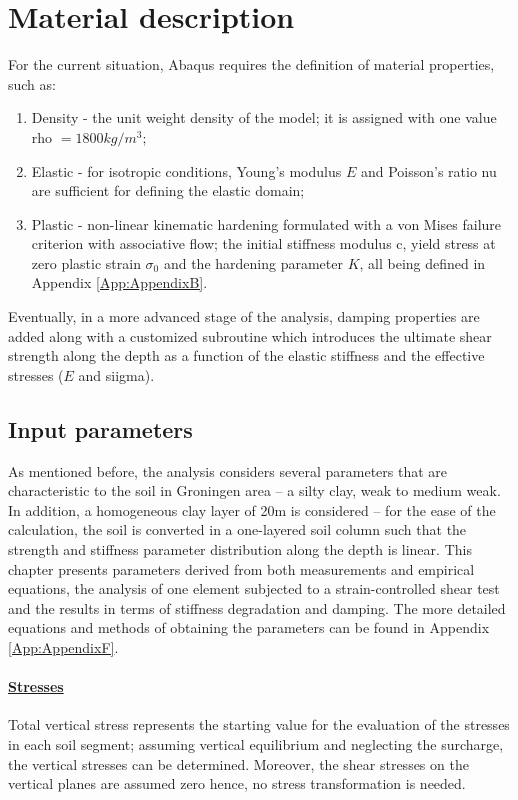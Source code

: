 \documentclass[11pt,a4paper]{report}
\begin{document}
\section{Material description}
For the current situation, Abaqus requires the definition of material properties, such as:
\begin{enumerate}
	\item Density - the unit weight density of the model; it is assigned with one value \gls{rho} $= 1800 kg/m^3$;
	\item Elastic - for isotropic conditions, Young's modulus $E$ and Poisson's ratio \gls{nu} are sufficient for defining the elastic domain;
	\item Plastic - non-linear kinematic hardening formulated with a von Mises failure criterion with associative flow; the initial stiffness modulus \gls{c}, yield stress at zero plastic strain $\sigma_0$ and the hardening parameter $K$, all being defined in Appendix \ref{App:AppendixB}.
\end{enumerate}

	Eventually, in a more advanced stage of the analysis, damping properties are added along with a customized subroutine which introduces the ultimate shear strength along the depth as a function of the elastic stiffness and the effective stresses ($E$ and \gls{siigma}).

\subsection{Input parameters}
As mentioned before, the analysis considers several parameters that are characteristic to the soil in Groningen area – a silty clay, weak to medium weak. In addition, a homogeneous clay layer of 20m is considered – for the ease of the calculation, the soil is converted in a one-layered soil column such that the strength and stiffness parameter distribution  along the depth is linear. This chapter presents parameters derived from both measurements and empirical equations, the analysis of one element subjected to a strain-controlled shear test and the results in terms of stiffness degradation and damping. The more detailed equations and methods of obtaining the parameters can be found in Appendix \ref{App:AppendixF}.	

\paragraph{\underline{Stresses}}
Total vertical stress represents the starting value for the evaluation of the stresses in each soil segment; assuming vertical equilibrium and neglecting the surcharge, the vertical stresses can be determined. Moreover, the shear stresses on the vertical planes are assumed zero hence, no stress transformation is needed.
\end{document}
